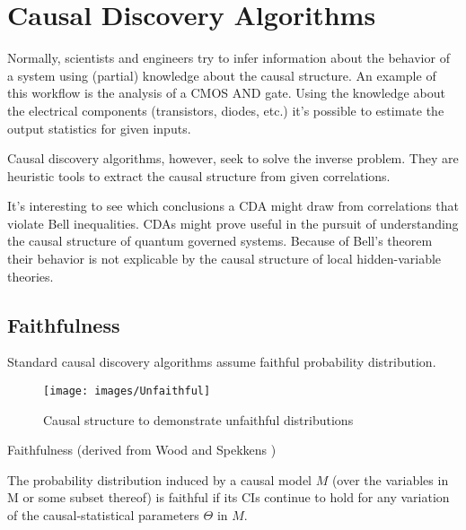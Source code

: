 \chapter{Causal Discovery Algorithms}
\label{CausalDiscoveryAlgorithms}

Normally, scientists and engineers try to infer information about the behavior of a system using (partial) knowledge about the causal structure.
An example of this workflow is the analysis of a CMOS AND gate.
Using the knowledge about the electrical components (transistors, diodes, etc.) it's possible to estimate the output statistics for given inputs.

Causal discovery algorithms, however, seek to solve the inverse problem.
They are heuristic tools to extract the causal structure from given correlations.

It's interesting to see which conclusions a \acl{CDA} might draw from correlations that violate Bell inequalities.
\Aclp{CDA} might prove useful in the pursuit of understanding the causal structure of quantum governed systems.
Because of Bell's theorem their behavior is not explicable by the causal structure of local hidden-variable theories.

\section{Faithfulness}
\label{Basics:Faithfulness}

Standard causal discovery algorithms assume faithful probability distribution.

\begin{figure}[b!]
\centering
\texttt{[image: images/Unfaithful]}
\caption{Causal structure to demonstrate unfaithful distributions}
\label{fig:Unfaithful}
\end{figure}

\begin{definition}
\label{Faithfulness}
Faithfulness (derived from Wood and Spekkens \cite{Wood.2015})

The probability distribution induced by a causal model $M$ (over the
variables in M or some subset thereof) is faithful if its CIs continue to hold for
any variation of the causal-statistical parameters $\Theta$ in $M$.
\end{definition}

